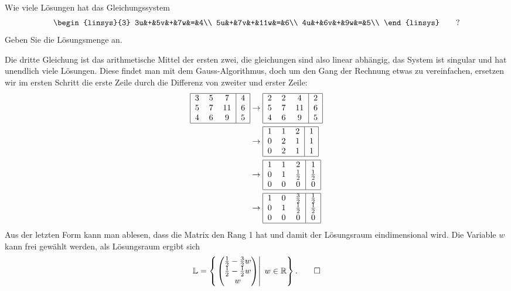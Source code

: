 Wie viele Lösungen hat das Gleichungssystem
\[
\begin{linsys}{3}
3u&+&5v&+&7w&=&4\\
5u&+&7v&+&11w&=&6\\
4u&+&6v&+&9w&=&5\\
\end{linsys}
\qquad
?
\]
Geben Sie die Lösungsmenge an.


\begin{loesung}
Die dritte Gleichung ist das arithmetische Mittel der ersten zwei,
die gleichungen sind also linear abhängig, das System ist singular
und hat unendlich viele Lösungen. Diese findet man mit dem
Gauss-Algorithmus, doch um den Gang der Rechnung etwas zu vereinfachen,
ersetzen wir im ersten Schritt die erste Zeile durch die Differenz von
zweiter und erster Zeile:
\begin{align*}
\begin{tabular}{|ccc|c|}
\hline
3&5&7&4\\
5&7&11&6\\
4&6&9&5\\
\hline
\end{tabular}
&\rightarrow
\begin{tabular}{|ccc|c|}
\hline
2&2&4&2\\
5&7&11&6\\
4&6&9&5\\
\hline
\end{tabular}
\\
&\rightarrow
\begin{tabular}{|ccc|c|}
\hline
1&1&2&1\\
0&2&1&1\\
0&2&1&1\\
\hline
\end{tabular}
\\
&\rightarrow
\begin{tabular}{|ccc|c|}
\hline
1&1&2&1\\
0&1&$\frac12$&$\frac12$\\
0&0&0&0\\
\hline
\end{tabular}
\\
&\rightarrow
\begin{tabular}{|ccc|c|}
\hline
1&0&$\frac32$&$\frac12$\\
0&1&$\frac12$&$\frac12$\\
0&0&0&0\\
\hline
\end{tabular}
\end{align*}
Aus der letzten Form kann man ablesen, dass die Matrix den
Rang 1 hat und damit der Lösungsraum eindimensional wird.
Die Variable $w$ kann frei gewählt werden, als Lösungsraum
ergibt sich
\[
{\mathbb L}=\left\{\left.\begin{pmatrix}\frac12-\frac32w\\\frac12-\frac12w\\w\end{pmatrix}\right|\;w\in\mathbb R\right\}.
\qedhere
\]
\end{loesung}

